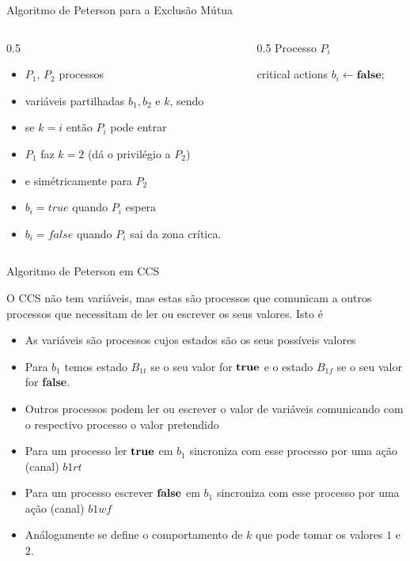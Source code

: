 \documentclass[aspectratio=169]{beamer}
\begin{document}
\begin{frame}{Algoritmo de Peterson para a Exclusão Mútua}
\begin{columns}
\begin{column}{0.5\textwidth}
\begin{itemize}
		\item $P_1$, $P_2$ processos
		\item variáveis partilhadas $b_1, b_2$ e $k$, sendo 
		\item se $k=i$ então $P_i$ pode entrar
		\item  $P_1$  faz $k=2$ (dá o privilégio a $P_2$)
		\item e simétricamente para $P_2$
\item $b_i=true$ quando $P_i$ espera
\item  $b_i=false$ quando $P_i$ sai da zona crítica.
			\end{itemize}
\end{column}
\begin{column}{0.5\textwidth}
Processo $P_i$\\
		 \begin{algorithmic}
	\State {}
 
\EndWhile
	\State \alert{critical actions}
\State$b_i\gets \mathbf{false};$
		\EndWhile		
\end{algorithmic}
\end{column}
\end{columns}
\end{frame}
\begin{frame}{Algoritmo de Peterson em CCS}

O CCS não tem variáveis, mas estas  são processos que comunicam a outros processos que necessitam de ler ou escrever os seus valores.  Isto é 
\begin{itemize}
	\item As variáveis  são \alert{processos} cujos estados são os seus possíveis valores
\item Para $b_1$ temos estado $B_{1t}$ se o seu valor for $\bf true$ e  o estado $B_{1f}$ se o seu valor for \textbf{false}.
\item  Outros processos podem ler ou escrever o valor de variáveis comunicando com o respectivo processo o valor pretendido 
\item Para um processo ler $\bf true$ em $b_1$ sincroniza com esse processo por uma ação (canal) $b1rt$
\item Para um processo escrever $\bf false$ em $b_1$ sincroniza com esse processo por uma ação (canal) $b1wf$
\item Análogamente se define o comportamento de $k$ que pode tomar os valores $1$ e $2$.
\end{itemize}
	
\end{frame}
\end{document}
